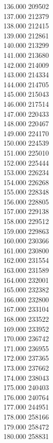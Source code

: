 { 136.000	209502 \\
 137.000	212379 \\
 138.000	212415 \\
 139.000	212861 \\
 140.000	213299 \\
 141.000	213680 \\
 142.000	214009 \\
 143.000	214334 \\
 144.000	214705 \\
 145.000	215043 \\
 146.000	217514 \\
 147.000	220433 \\
 148.000	220467 \\
 149.000	224170 \\
 150.000	224539 \\
 151.000	225010 \\
 152.000	225444 \\
 153.000	226234 \\
 154.000	226268 \\
 155.000	228348 \\
 156.000	228805 \\
 157.000	229138 \\
 158.000	229512 \\
 159.000	229863 \\
 160.000	230366 \\
 161.000	230800 \\
 162.000	231554 \\
 163.000	231589 \\
 164.000	232001 \\
 165.000	232382 \\
 166.000	232800 \\
 167.000	233104 \\
 168.000	233522 \\
 169.000	233952 \\
 170.000	236742 \\
 171.000	236955 \\
 172.000	237365 \\
 173.000	237662 \\
 174.000	238043 \\
 175.000	240403 \\
 176.000	240764 \\
 177.000	244951 \\
 178.000	258166 \\
 179.000	258472 \\
 180.000	258831 \\
}
